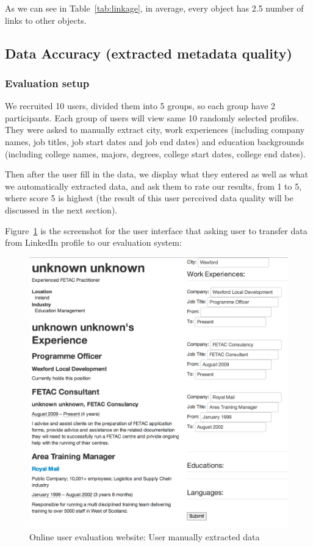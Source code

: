 As we can see in Table~\ref{tab:linkage}, in average, every object has 2.5 number of links to other objects.

\subsection{Data Accuracy (extracted metadata quality)}\label{subsec:accuracy}

\subsubsection{Evaluation setup}

We recruited 10 users, divided them into 5 groups, so each group have 2 participants. Each group of users will view same 10 randomly selected profiles. They were asked to manually extract city, work experiences (including company names, job titles, job start dates and job end dates) and education backgrounds (including college names, majors, degrees, college start dates, college end dates).

Then after the user fill in the data, we display what they entered as well as what we automatically extracted data, and ask them to rate our results, from 1 to 5, where score 5 is highest (the result of this user perceived data quality will be discussed in the next section).

Figure~\ref{fig:UserInput} is the screenshot for the user interface that asking user to transfer data from LinkedIn profile to our evaluation system:

\begin{figure}[H]
	\centering
	\includegraphics[width=1.0\textwidth]{images/user-input.png}
	\caption{Online user evaluation website: User manually extracted data\protect}
	\label{fig:UserInput}
\end{figure}

